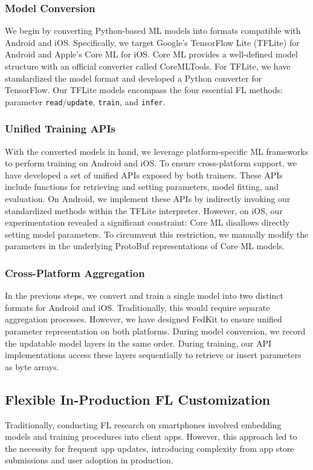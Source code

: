 \documentclass[letterpaper]{article} %
\begin{document}
\subsubsection{Model Conversion}
We begin by converting Python-based ML models into formats compatible with
Android and iOS.
Specifically, we target Google's TensorFlow Lite (TFLite) for Android and
Apple's Core ML for iOS.
Core ML provides a well-defined model structure with
an official converter called CoreMLTools.
For TFLite, we have standardized the model format and
developed a Python converter for TensorFlow.
Our TFLite models encompass the four essential FL methods:
parameter \texttt{read}/\texttt{update}, \texttt{train}, and \texttt{infer}.

\subsubsection{Unified Training APIs}
With the converted models in hand,
we leverage platform-specific ML frameworks to
perform training on Android and iOS.
To ensure cross-platform support,
we have developed a set of unified APIs exposed by both trainers.
These APIs include functions for retrieving and setting parameters,
model fitting, and evaluation.
On Android, we implement these APIs by indirectly invoking
our standardized methods within the TFLite interpreter.
However, on iOS, our experimentation revealed a significant constraint:
Core ML disallows directly setting model parameters.
To circumvent this restriction,
we manually modify the parameters in the underlying ProtoBuf representations of
Core ML models.

\subsubsection{Cross-Platform Aggregation}
In the previous steps,
we convert and train a single model into two distinct formats for
Android and iOS.
Traditionally, this would require separate aggregation processes.
However, we have designed FedKit to ensure unified parameter representation
on both platforms.
During model conversion,
we record the updatable model layers in the same order.
During training,
our API implementations access these layers sequentially to
retrieve or insert parameters as byte arrays.

\subsection{Flexible In-Production FL Customization}
\newcommand{\model}{$M$}
\newcommand{\fs}{$S_\mathrm F$}
Traditionally, conducting FL research on smartphones involved
embedding models and training procedures into client apps.
However, this approach led to the necessity for frequent app updates,
introducing complexity from app store submissions and user adoption
in production.
\end{document}
